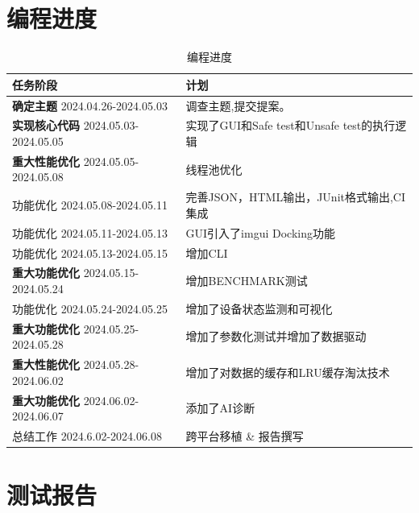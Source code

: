 \documentclass{article}
\begin{document}
\section{编程进度}
\begin{table}[H]
    \centering
    \begin{tabular}{|l|l|}
        \toprule
        \textbf{任务阶段}                          & \textbf{计划}                       \\ \midrule
        \textbf{确定主题} 2024.04.26-2024.05.03    & 调查主题,提交提案。                        \\ \midrule
        \textbf{实现核心代码} 2024.05.03-2024.05.05  & 实现了GUI和Safe test和Unsafe test的执行逻辑 \\ \midrule
        \textbf{重大性能优化} 2024.05.05-2024.05.08  & 线程池优化                             \\ \midrule
        功能优化 2024.05.08-2024.05.11             & 完善JSON，HTML输出，JUnit格式输出,CI集成      \\ \midrule
        功能优化 2024.05.11-2024.05.13             & GUI引入了imgui Docking功能             \\ \midrule
        功能优化 2024.05.13-2024.05.15             & 增加CLI                             \\ \midrule
        \textbf{重大功能优化} 2024.05.15-2024.05.24  & 增加BENCHMARK测试                     \\ \midrule
        功能优化 2024.05.24-2024.05.25             & 增加了设备状态监测和可视化                     \\ \midrule
        \textbf{重大功能优化} 2024.05.25-2024.05.28  & 增加了参数化测试并增加了数据驱动                  \\ \midrule
        \textbf{重大性能优化} 2024.05.28-2024.06.02  & 增加了对数据的缓存和LRU缓存淘汰技术               \\ \midrule
        \textbf{重大功能优化}  2024.06.02-2024.06.07 & 添加了AI诊断                           \\ \midrule
        总结工作 2024.6.02-2024.06.08              & 跨平台移植 \& 报告撰写                     \\
        \bottomrule
    \end{tabular}
    \caption{编程进度}
\end{table}

\section{测试报告}
\end{document}
